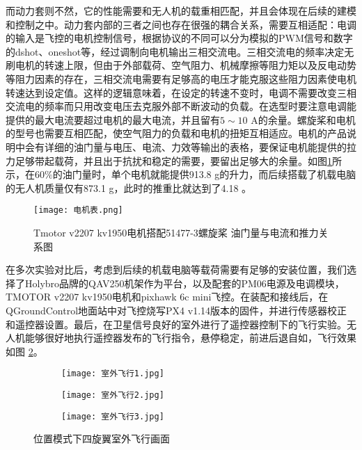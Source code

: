 而动力套则不然，它的性能需要和无人机的载重相匹配，并且会体现在后续的建模和控制之中。动力套内部的三者之间也存在很强的耦合关系，需要互相适配：电调的输入是飞控的电机控制信号，根据协议的不同可以分为模拟的PWM信号和数字的dshot、oneshot等，经过调制向电机输出三相交流电。三相交流电的频率决定无刷电机的转速上限，但由于外部载荷、空气阻力、机械摩擦等阻力矩以及反电动势等阻力因素的存在，三相交流电需要有足够高的电压才能克服这些阻力因素使电机转速达到设定值。这样的逻辑意味着，在设定的转速不变时，电调不需要改变三相交流电的频率而只用改变电压去克服外部不断波动的负载。在选型时要注意电调能提供的最大电流要超过电机的最大电流，并且留有$5\sim 10$ A的余量。螺旋桨和电机的型号也需要互相匹配，使空气阻力的负载和电机的扭矩互相适应。电机的产品说明中会有详细的油门量与电压、电流、力效等输出的表格，要保证电机能提供的拉力足够带起载荷，并且出于抗扰和稳定的需要，要留出足够大的余量。如图\ref{电机表}所示，在$60 \%$的油门量时，单个电机就能提供913.8 g的升力，而后续搭载了机载电脑的无人机质量仅有873.1 g，此时的推重比就达到了4.18 。
\begin{figure}[!h]
  \centering
  \texttt{[image: 电机表.png]}
  \caption{Tmotor v2207 kv1950电机搭配51477-3螺旋桨 油门量与电流和推力关系图 \cite{Tmotor2023}}
  \label{电机表}
\end{figure}

在多次实验对比后，考虑到后续的机载电脑等载荷需要有足够的安装位置，我们选择了Holybro品牌的QAV250机架作为平台，以及配套的PM06电源及电调模块，TMOTOR v2207 kv1950电机和pixhawk 6c mini飞控。在装配和接线后，在QGroundControl地面站中对飞控烧写PX4 v1.14版本的固件，并进行传感器校正和遥控器设置。最后，在卫星信号良好的室外进行了遥控器控制下的飞行实验。无人机能够很好地执行遥控器发布的飞行指令，悬停稳定，前进后退自如，飞行效果如图 \ref{室外飞行}。
\begin{figure}[!h]
  \centering
  \begin{subfigure}[c]{0.33\textwidth}
    \centering
    \texttt{[image: 室外飞行1.jpg]}
  \end{subfigure} \hfill
  \begin{subfigure}[c]{0.33\textwidth}
    \centering
    \texttt{[image: 室外飞行2.jpg]}
  \end{subfigure}\hfill
    \begin{subfigure}[c]{0.33\textwidth}
      \centering
      \texttt{[image: 室外飞行3.jpg]}
  \end{subfigure}
  \caption{位置模式下四旋翼室外飞行画面}
  \label{室外飞行}
  \end{figure}

